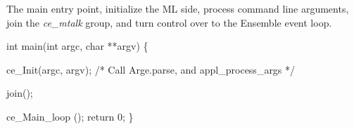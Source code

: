 The main entry point, initialize the ML side, process command line 
arguments, join the {\it ce\_mtalk} group, and turn control over
to the Ensemble event loop.
\begin{codebox}
int main(int argc, char **argv) \{
  
  ce_Init(argc, argv); /* Call Arge.parse, and appl_process_args */

  join();
  
  ce_Main_loop ();
  return 0;
\}
\end{codebox}


